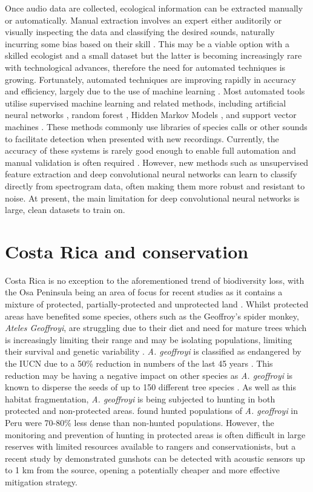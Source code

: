 Once audio data are collected, ecological information can be extracted manually or automatically. Manual extraction involves an expert either auditorily or visually inspecting the data and classifying the desired sounds, naturally incurring some bias based on their skill \citep{Heinicke2015}. This may be a viable option with a skilled ecologist and a small dataset but the latter is becoming increasingly rare with technological advances, therefore the need for automated techniques is growing. Fortunately, automated techniques are improving rapidly in accuracy and efficiency, largely due to the use of machine learning \citep{Digby2013}. Most automated tools utilise supervised machine learning and related methods, including artificial neural networks \citep{Walters2012}, random forest \citep{ZamoraGutierrez2016}, Hidden Markov Models \citep{Zilli2014}, and support vector machines \citep{Heinicke2015}. These methods commonly use libraries of species calls or other sounds to facilitate detection when presented with new recordings. Currently, the accuracy of these systems is rarely good enough to enable full automation and manual validation is often required \citep{Kalan2016}. However, new methods such as unsupervised feature extraction \citep{Stowell2014} and deep convolutional neural networks \citep{Goeau2016} can learn to classify directly from spectrogram data, often making them more robust and resistant to noise. At present, the main limitation for deep convolutional neural networks is large, clean datasets to train on.

\section{Costa Rica and conservation}

Costa Rica is no exception to the aforementioned trend of biodiversity loss, with the Osa Peninsula being an area of focus for recent studies as it contains a mixture of protected, partially-protected and unprotected land \citep{Lawson2019}. Whilst protected areas have benefited some species, others such as the Geoffroy’s spider monkey, \textit{Ateles Geoffroyi}, are struggling due to their diet and need for mature trees which is increasingly limiting their range and may be isolating populations, limiting their survival and genetic variability \citep{Chapman1989}. \textit{A. geoffroyi} is classified as endangered by the IUCN due to a 50\% reduction in numbers of the last 45 years \citep{Cuaron2008}. This reduction may be having a negative impact on other species as \textit{A. geoffroyi} is known to disperse the seeds of up to 150 different tree species \citep{VanRoosmalen1985}. As well as this habitat fragmentation, \textit{A. geoffroyi} is being subjected to hunting in both protected and non-protected areas. \cite{Aquino2013} found hunted populations of \textit{A. geoffroyi} in Peru were 70-80\% less dense than non-hunted populations. However, the monitoring and prevention of hunting in protected areas is often difficult in large reserves with limited resources available to rangers and conservationists, but a recent study by \cite{Hill2018} demonstrated gunshots can be detected with acoustic sensors up to 1 km from the source, opening a potentially cheaper and more effective mitigation strategy.

